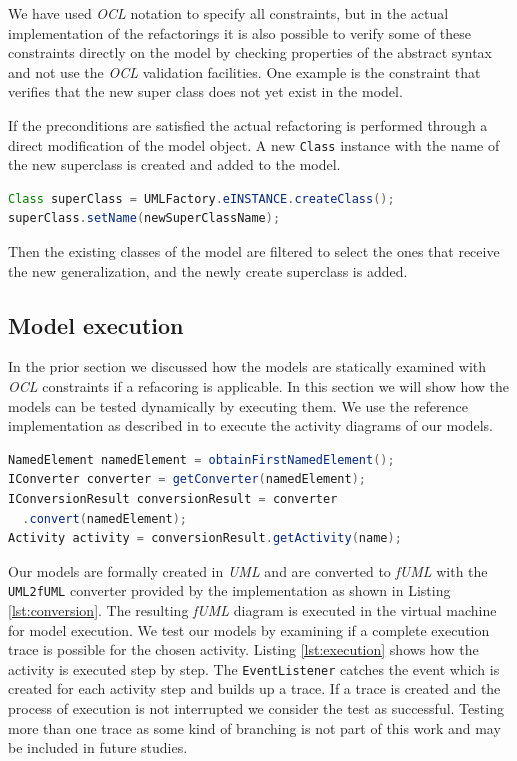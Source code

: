 \documentclass{llncs}
\begin{document}
We have used \textit{OCL} notation to specify all constraints, but in the actual implementation of the refactorings it
is also possible to verify some of these constraints directly on the model by checking properties of the abstract syntax
and not use the \textit{OCL} validation facilities. One example is the constraint that verifies that the new super class does not
yet exist in the model.

If the preconditions are satisfied the actual refactoring is performed through a direct modification of the model object.
A new \texttt{Class} instance with the name of the new superclass is created and added to the model. 

\begin{lstlisting}[language=Java,caption=UML element creation,label=lst:createclass]
Class superClass = UMLFactory.eINSTANCE.createClass();
superClass.setName(newSuperClassName);
\end{lstlisting}


Then the existing
classes of the model are filtered to select the ones that receive the new generalization, and the newly create superclass
is added.

\subsection{Model execution}
\label{sec:execution}
In the prior section we discussed how the models are statically examined with \textit{OCL} constraints if a refacoring 
is applicable. In this section we will show how the models can be tested dynamically by executing them. We use the 
reference implementation as described in \cite{DBLP:conf/models/MayerhoferLK12} to execute the activity diagrams of 
our models.

\begin{lstlisting}[language=Java,caption=Converting the UML diagram to fUML,label=lst:conversion]
NamedElement namedElement = obtainFirstNamedElement();
IConverter converter = getConverter(namedElement);
IConversionResult conversionResult = converter
  .convert(namedElement);
Activity activity = conversionResult.getActivity(name);
\end{lstlisting}

Our models are formally created in \textit{UML} and are converted to \textit{fUML} with the \texttt{UML2fUML} converter 
provided by the implementation as shown in Listing \ref{lst:conversion}. The resulting \textit{fUML} diagram is executed in the 
virtual machine for model execution. 
We test our models by examining if a complete execution trace is possible for the chosen activity. Listing \ref{lst:execution} 
shows how the activity is executed step by step. The \texttt{EventListener} catches the event which is created for each 
activity step and builds up a trace. If a trace is created and the process of execution is not interrupted we consider the 
test as successful. Testing more than one trace as some kind of branching is not part of this work and may be included in future studies.
\end{document}
